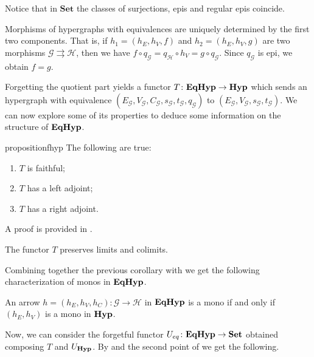 \documentclass[a4paper,UKenglish,cleveref,pdftex,thm-restate,numberwithinsect]{lipics-v2021}
\newcommand{\eq}{\mathsf{eq}}
\newcommand{\Set}{\mathbf{Set}}
\newcommand{\catname}[1]{\textbf{\textup{#1}}}
\newcommand{\hyp}{\catname{Hyp}}
\newcommand{\EqHyp}{\catname{EqHyp}} %
\begin{document}
\begin{remark}
	Notice that in $\Set$ the classes of surjections, epis and regular epis coincide.
\end{remark}

\begin{remark}\label{rem:eqhyp_morphs}
	Morphisms of hypergraphs with equivalences are uniquely determined by the first two components. That is, if $h_1 = (h_E, h_V, f)$ and $h_2 = (h_E, h_V, g)$ are two morphisms $\mathcal{G} \rightrightarrows \mathcal{H}$, then we have
	$
	f \circ q_\mathcal{G} = q_\mathcal{H}\circ h_V =g\circ q_\mathcal{G}.
	$
	Since $q_\mathcal{G}$ is epi, we obtain $f = g$.
\end{remark}

Forgetting the quotient part yields a functor $T\colon \EqHyp \to \hyp$ which sends an hypergraph with equivalence $(E_\mathcal{G}, V_{\mathcal{G}}, C_\mathcal{G}, s_\mathcal{G}, t_\mathcal{G}, q_\mathcal{G})$ to $(E_{\mathcal{G}}, V_{\mathcal{G}}, s_\mathcal{G}, t_{\mathcal{G}})$.   We can now explore some of its properties to deduce some information on the structure of $\EqHyp$.  

\begin{restatable}{proposition}{fhyp}\label{prop:forghyp}  The following are true:
	\begin{enumerate}
		\item$T$ is faithful;
		\item $T$ has a left adjoint;
		\item $T$ has a right adjoint.
	\end{enumerate}
\end{restatable}
A proof is provided in .


\begin{corollary}\label{cor:limcolim}
	The functor $T$ preserves limits and colimits.
\end{corollary}

Combining together the previous corollary with  we get the following characterization of monos in $\EqHyp$.

\begin{corollary}\label{cor:mono1}
	An arrow $h = (h_E, h_V, h_C): \mathcal{G \to H}$ in $\EqHyp$ is a mono if and only if $(h_E, h_V)$ is a mono in $\hyp$.
\end{corollary}

Now, we can consider the forgetful functor $U_{\eq}\colon \EqHyp\to \Set$ obtained composing $T$ and $U_{\hyp}$.  By  and the second point of  we get the following.
\end{document}
